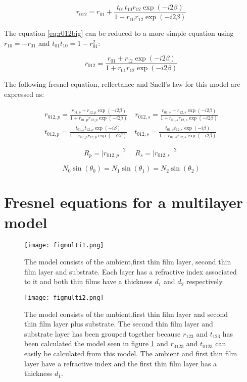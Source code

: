 \documentclass[MasterThesisMain.tex]{subfiles}
\begin{document}
\begin{equation} \label{eq:r012big}
r_{012}=r_{01}+\frac{t_{01}t_{10}r_{12}\exp(-i2\beta)}{1-r_{10}r_{12}\exp(-i2\beta)}
\end{equation}

The equation \ref{eq:r012big} can be reduced to a more simple equation using $r_{10}=-r_{01}$ and $t_{01}t_{10}=1-r_{01}^2$:

\begin{equation}\label{eq:2layerreflect}
r_{012}= \frac{r_{01}+r_{12}\exp(-i2\beta)}{1+r_{01}r_{12}\exp(-i2\beta)}
\end{equation} 

The following fresnel equation, reflectance and Snell's law for this model are expressed as:

\begin{align}
r_{012,p} = \frac{r_{01,p}+r_{12,p}\exp(-i2\beta)}{1+r_{01,p}r_{12,p}\exp(-i2\beta)} \quad r_{012,s}= \frac{r_{01,s}+r_{12,s}\exp(-i2\beta)}{1+r_{01,s}r_{12,s}\exp(-i2\beta)}\\
t_{012,p} = \frac{t_{01,p}t_{12,p}\exp(-i\beta)}{1+r_{01,p}r_{12,p}\exp(-i2\beta)} \quad t_{012,s} = \frac{t_{01,s}t_{12,s}\exp(-i\beta)}{1+r_{01,s}r_{12,s}\exp(-i2\beta)} \label{eq:2layertrans}
\end{align}

\begin{equation}
R_p=\mid r_{012,p} \mid^2 \quad R_s=\mid r_{012,s} \mid^2
\end{equation}

\begin{equation}
N_0\sin(\theta_0)=N_1\sin(\theta_1)=N_2\sin(\theta_2)
\end{equation} 

\section{Fresnel equations for a multilayer model}\label{ch:fresnelmulti} 

\begin{figure}
\centering
\texttt{[image: figmulti1.png]}
\caption{The model consists of the ambient,first thin film layer, second thin film layer and substrate. Each layer has a refractive index associated to it and both thin films have a thickness $d_1$ and $d_2$ respectively.}
\label{fig:multilayer1}
\end{figure}

\begin{figure}
\centering
\texttt{[image: figmulti2.png]}
\caption{The model consists of the ambient,first thin film layer and second thin film layer plus substrate. The second thin film layer and substrate layer has been grouped together because $r_{123}$ and $t_{123}$ has been calculated the model seen in figure \ref{fig:multilayer1} and $r_{0123}$ and $t_{0123}$ can easily be calculated from this model. The ambient and first thin film layer have a refractive index and the first thin film layer has a thickness $d_1$.}
\label{fig:multilayer2}
\end{figure}
\end{document}
